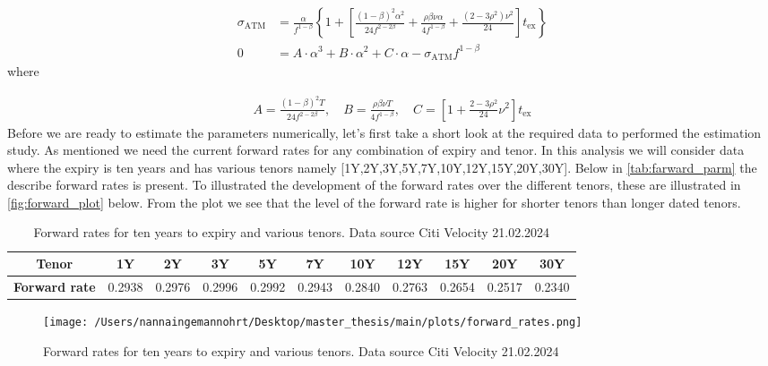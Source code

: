 \begin{align}
    \sigma_{\text{ATM}}  & = \frac{\alpha}{f^{1-\beta}} \left\{ 1 +
     \left[ \frac{(1-\beta)^2 \alpha^2}{24 f^{2-2\beta}} + \frac{\rho \beta \nu \alpha}{4 f^{1-\beta}}
      + \frac{(2-3\rho^2) \nu^2}{24} \right] t_{\text{ex}} \right\} \label{sigma_atm} \\
      0 &= A \cdot \alpha^3 + B \cdot \alpha^2 + C \cdot \alpha - \sigma_{\text{ATM}} f^{1-\beta}
\end{align}
where

\begin{align}
    A = \frac{(1-\beta)^2 T}{24 f^{2-2\beta}},
    \quad B = \frac{\rho \beta \nu T}{4 f^{1-\beta}},
    \quad C = \left[ 1 + \frac{2-3\rho^2}{24} \nu^2 \right] t_{\text{ex}} \label{ABC}
\end{align}
Before we are ready to estimate the parameters numerically, let's first take a short look at the required 
data to performed the estimation study. As mentioned we need the current forward rates for any combination 
of expiry and tenor. In this analysis we will consider data where the expiry is ten years and has various tenors 
namely [1Y,2Y,3Y,5Y,7Y,10Y,12Y,15Y,20Y,30Y]. Below in \autoref{tab:farward_parm} the describe forward rates is 
present. To illustrated the development of the forward rates over the different tenors, these are illustrated
in \autoref{fig:forward_plot} below. From the plot we see that the level of the forward rate is higher for
shorter tenors than longer dated tenors.
\\
\begin{table}[H]
    \centering
    \begin{tabular}{ccccccccccc}
      \toprule
      \textbf{ Tenor} & 1Y & 2Y & 3Y & 5Y & 7Y & 10Y & 12Y & 15Y & 20Y & 30Y \\
      \midrule
      \textbf{ Forward rate}&0.2938 & 0.2976 & 0.2996 &0.2992 &0.2943 &0.2840 
      &0.2763 & 0.2654& 0.2517 & 0.2340\\
      \bottomrule
    \end{tabular}
    \caption{Forward rates for ten years to expiry and various tenors. Data source Citi Velocity 21.02.2024}
    \label{tab:farward_parm}
\end{table}
\begin{figure}[H]
    \centering
    \texttt{[image: /Users/nannaingemannohrt/Desktop/master\_thesis/main/plots/forward\_rates.png]}
    \caption{Forward rates for ten years to expiry and various tenors. Data source Citi Velocity 21.02.2024}
    \label{fig:forward_plot}
\end{figure}
